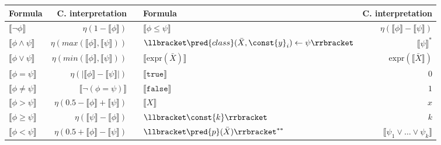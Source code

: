 
\begin{table}
    \small{
    \centering
    \begin{tabular}{l|r||cl|r}
        \textbf{Formula} & \textbf{C. interpretation} & & \textbf{Formula} & \textbf{C. interpretation}
        \\
        \hline\hline
        $\llbracket\neg \phi\rrbracket$ & $\eta(1 - \llbracket\phi\rrbracket)$ & & $\llbracket\phi \le \psi\rrbracket$  & $\eta(\llbracket\phi\rrbracket - \llbracket\psi\rrbracket)$
        \\
        $\llbracket\phi  \wedge \psi\rrbracket$ &  $\eta(max(\llbracket\phi\rrbracket, \llbracket\psi\rrbracket))$ & & $\llbracket \pred{class}(\bar{X}, \const{y}_i) \leftarrow \psi \rrbracket$ & $\llbracket \psi \rrbracket^{*}$
        \\
        $\llbracket\phi  \vee \psi\rrbracket$ & $\eta(min(\llbracket\phi\rrbracket, \llbracket\psi\rrbracket))$ & & $\llbracket \text{expr}(\bar{X}) \rrbracket$ & $\text{expr}(\llbracket\bar{X}\rrbracket)$
        \\
        $\llbracket\phi = \psi\rrbracket$ & $\eta(|\llbracket\phi\rrbracket-\llbracket\psi\rrbracket|)$ & & $\llbracket \mathtt{true} \rrbracket$ & $0$
        \\
        $\llbracket\phi \ne \psi\rrbracket$ & $\llbracket \neg ( \phi = \psi )\rrbracket$ & & $\llbracket \mathtt{false} \rrbracket$ & $1$
        \\
        $\llbracket\phi > \psi\rrbracket$  & $\eta(0.5 - \llbracket\phi\rrbracket + \llbracket\psi\rrbracket) $ & & $\llbracket X \rrbracket$ & $x$
        \\
        $\llbracket\phi \ge \psi\rrbracket$ & $\eta(\llbracket\psi\rrbracket - \llbracket\phi\rrbracket)$ & & $\llbracket \const{k} \rrbracket$ & $k$
        \\
        $\llbracket\phi < \psi\rrbracket$  &  $\eta(0.5 + \llbracket\phi\rrbracket - \llbracket\psi\rrbracket)$ & & $\llbracket \pred{p}(\bar{X}) \rrbracket^{**}$ & $\llbracket \psi_1 \vee \ldots \vee \psi_k \rrbracket$
        

\end{tabular}}
\end{table}
